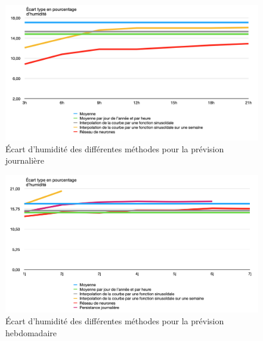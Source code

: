 \documentclass[11pt,a4paper]{article}
\begin{document}
\begin{figure} [!h]
\centering
\includegraphics[width=0.7 \textwidth]{imagesTIPE/ecartjH.png}\quad
\caption{\label{fig:cosDS} Écart d'humidité des différentes méthodes pour la prévision journalière}
\end{figure}

\begin{figure} [!h]
\centering
\includegraphics[width= 0.7 \textwidth]{imagesTIPE/ecartsH.png}\quad
\caption{\label{fig:cosDS} Écart d'humidité des différentes méthodes pour la prévision hebdomadaire}
\end{figure}


%





















\end{document}
